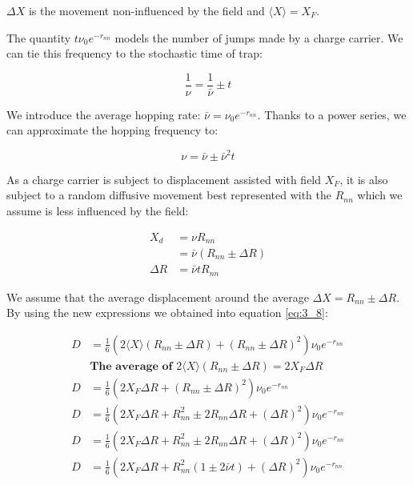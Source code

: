 $\Delta X$ is the movement non-influenced by the field and $\langle X \rangle = X_F$.

The quantity $t \nu_0 e^{-r_{nn}}$ models the number of jumps made by a charge carrier. We can tie this frequency to the stochastic time of trap:

\begin{equation}
    \frac{1}{\nu} = \frac{1}{\bar\nu} \pm t
    \label{eq:3_9_2}
\end{equation}

We introduce the average hopping rate: $\bar\nu = \nu_0 e^{-r_{nn}}$. Thanks to a power series, we can approximate the hopping frequency to:

\begin{equation}
    \nu = \bar\nu \pm \bar\nu^2 t
    \label{eq:3_9_3}
\end{equation}

As a charge carrier is subject to displacement assisted with field $X_F$, it is also subject to a random diffusive movement best represented with the $R_{nn}$ which we assume is less influenced by the field:

\begin{equation}
    \begin{aligned}
        X_d &= \nu R_{nn} \\
        &= \bar \nu (R_{nn} \pm \Delta R)\\
        \Delta R &= \bar\nu t R_{nn}
    \end{aligned}
    \label{eq:3_9_4}
\end{equation}

We assume that the average displacement around the average $\Delta X = R_{nn} \pm \Delta R$. By using the new expressions we obtained into equation \ref{eq:3_8}:

\begin{equation}
    \begin{aligned}
        D &= \frac{1}{6} \left( 2\langle X \rangle(R_{nn} \pm \Delta R) + (R_{nn} \pm \Delta R)^2 \right) \nu_0 e^{-r_{nn}} \\
        & \textbf{The average of } 2\langle X \rangle(R_{nn} \pm \Delta R) = 2X_F \Delta R \\
        D &= \frac{1}{6} \left( 2X_F \Delta R + (R_{nn} \pm \Delta R)^2 \right) \nu_0 e^{-r_{nn}} \\
        D &= \frac{1}{6} \left( 2X_F \Delta R + R_{nn}^2 \pm 2R_{nn}\Delta R + (\Delta R)^2 \right) \nu_0 e^{-r_{nn}} \\
        D &= \frac{1}{6} \left( 2X_F \Delta R + R_{nn}^2 \pm 2R_{nn}\Delta R + (\Delta R)^2 \right) \nu_0 e^{-r_{nn}} \\
        D &= \frac{1}{6} \left( 2X_F \Delta R + R_{nn}^2 (1 \pm 2\bar\nu t) + (\Delta R)^2 \right) \nu_0 e^{-r_{nn}} \\
    \end{aligned}
    \label{eq:3_10}
\end{equation}

